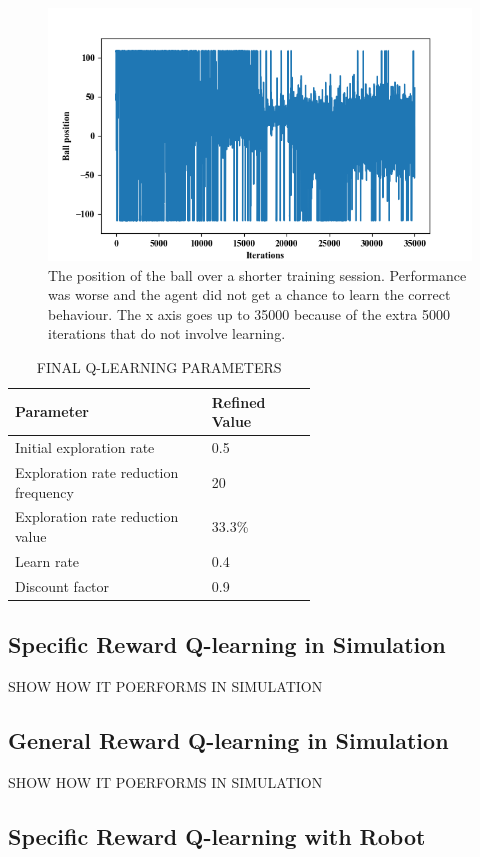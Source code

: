 \documentclass[12pt,a4paper]{article}
\begin{document}
\begin{figure}[H]
	\includegraphics{154_small}
	\caption{The position of the ball over a shorter training session. Performance was worse and the agent did not get a chance to learn the correct behaviour. The x axis goes up to 35000 because of the extra 5000 iterations that do not involve learning.}
\end{figure}
\begin{table}[htb]
\centering
\caption{FINAL Q-LEARNING PARAMETERS}
\vspace*{6pt}
\label{q_params}
\begin{tabular}{>{\raggedright}p{0.4\linewidth}p{0.2\linewidth}}\hline
Parameter & Refined Value\\ \hline\hline
Initial exploration rate & 0.5\\ \hline
Exploration rate reduction frequency & 20\\ \hline
Exploration rate reduction value & 33.3\% \\\hline
Learn rate & 0.4 \\\hline
Discount factor & 0.9 \\\hline
\end{tabular}
\end{table}


\subsection{Specific Reward Q-learning in Simulation}
SHOW HOW IT POERFORMS IN SIMULATION
\subsection{General Reward Q-learning in Simulation}
SHOW HOW IT POERFORMS IN SIMULATION
\subsection{Specific Reward Q-learning with Robot}
\end{document}

